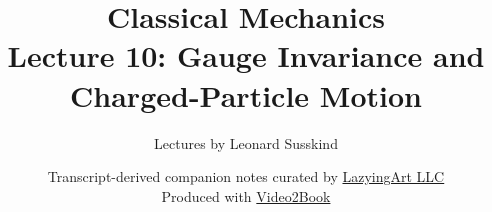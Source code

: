 \documentclass[11pt,oneside]{book}
\begin{document}
\hypersetup{pageanchor=false}
\frontmatter
\title{Classical Mechanics\\[0.45em]
\large Lecture 10: Gauge Invariance and Charged-Particle Motion}
\author{Lectures by Leonard Susskind}
\date{Transcript-derived companion notes curated by
\href{https://lazying.art}{LazyingArt LLC}\\[0.35em]
\small Produced with
\href{https://github.com/lachlanchen/Video2Book}{Video2Book}}
\maketitle
\hypersetup{pageanchor=true}
\mainmatter

\end{document}

